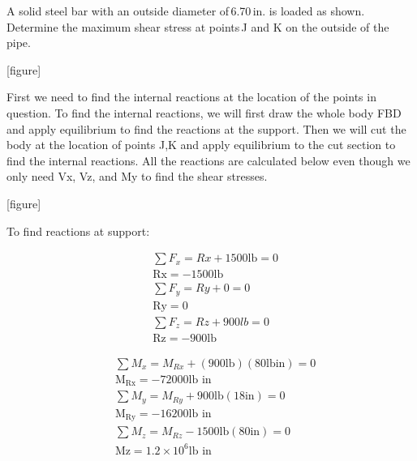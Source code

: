 \documentclass[
  letterpaper,
  DIV=11,
  numbers=noendperiod]{scrreprt}
\begin{document}
\begin{tcolorbox}[enhanced jigsaw, breakable, opacityback=0, toptitle=1mm, left=2mm, colback=white, opacitybacktitle=0.6, colframe=quarto-callout-note-color-frame, titlerule=0mm, arc=.35mm, leftrule=.75mm, bottomtitle=1mm, colbacktitle=quarto-callout-note-color!10!white, rightrule=.15mm, title={Example 14.6:}, bottomrule=.15mm, toprule=.15mm, coltitle=black]

A solid steel bar with an outside diameter of\,6.70\,in. is loaded as
shown. Determine the maximum shear stress at points\,J and K on the
outside of the pipe.

{[}figure{]}

\begin{tcolorbox}[enhanced jigsaw, breakable, opacityback=0, toptitle=1mm, left=2mm, colback=white, opacitybacktitle=0.6, colframe=quarto-callout-note-color-frame, titlerule=0mm, arc=.35mm, leftrule=.75mm, bottomtitle=1mm, colbacktitle=quarto-callout-note-color!10!white, rightrule=.15mm, title={Solution}, bottomrule=.15mm, toprule=.15mm, coltitle=black]

First we need to find the internal reactions at the location of the
points in question. To find the internal reactions, we will first draw
the whole body FBD and apply equilibrium to find the reactions at the
support. Then we will cut the body at the location of points J,K and
apply equilibrium to the cut section to find the internal reactions. All
the reactions are calculated below even though we only need Vx, Vz, and
My to find the shear stresses.

{[}figure{]}

To find reactions at support:

\[
\begin{aligned}
& \sum F_x=R x+1500 \mathrm{lb}=0 \\
& \mathrm{Rx}=-1500 \mathrm{lb} \\
& \sum F_y=R y+0=0 \\
& \mathrm{Ry}=0 \\
& \sum F_z=R z+900 l b=0 \\
& \mathrm{Rz}=-900 \mathrm{lb}
\end{aligned}
\]

\[
\begin{aligned}
& \sum M_x=M_{R x}+(900 \mathrm{lb})(80 \mathrm{lb} \mathrm{in})=0 \\
& \mathrm{M}_{\mathrm{Rx}}=-72000 \mathrm{lb} \text { in } \\
& \sum M_y=M_{R y}+900 \mathrm{lb}(18 \mathrm{in})=0 \\
& \mathrm{M}_{\mathrm{Ry}}=-16200 \mathrm{lb} \text { in } \\
& \sum M_z=M_{R z}-1500 \mathrm{lb}(80 \mathrm{in})=0 \\
& \mathrm{Mz}=1.2 \times 10^6 \mathrm{lb} \text { in }
\end{aligned}
\]


\end{tcolorbox}
\end{tcolorbox}
\end{document}
